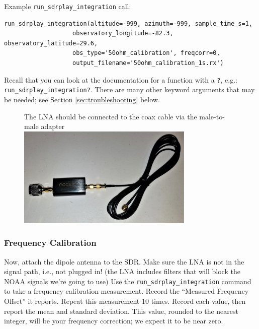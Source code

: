 \documentclass[11pt]{article}
\begin{document}
Example \verb|run_sdrplay_integration| call:\\
\begin{verbatim}
run_sdrplay_integration(altitude=-999, azimuth=-999, sample_time_s=1,
                   observatory_longitude=-82.3, observatory_latitude=29.6,
                   obs_type='50ohm_calibration', freqcorr=0,
                   output_filename='50ohm_calibration_1s.rx')
\end{verbatim}

Recall that you can look at the documentation for a function with a \verb|?|, e.g.:
\verb|run_sdrplay_integration?|.  There are many other keyword arguments that may be needed;
see Section \ref{sec:troubleshooting} below.



\begin{figure}[htp]
    \centering
    The LNA should be connected to the coax cable via the male-to-male adapter\\
\includegraphics[width=0.75\textwidth]{RadioLabPhotos/coaxcable_to_LNA.jpg}
\end{figure}

\subsubsection{Frequency Calibration}
\label{sec:freqcal}
Now, attach the dipole antenna to the SDR.
Make sure the LNA is not in the signal path, i.e., not plugged in!  (the LNA includes filters that will block the NOAA signals we're going to use)
Use the \verb|run_sdrplay_integration| command to take a frequency calibration measurement.
Record the ``Measured Frequency Offset'' it reports.
Repeat this measurement 10 times.
Record each value, then report the mean and standard deviation.
This value, rounded to the nearest integer, will be your frequency correction; we expect it to be near zero.
\end{document}
